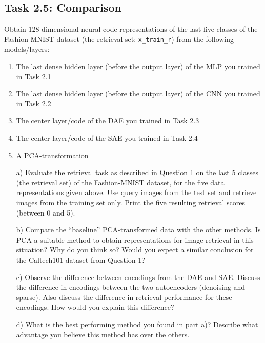 \documentclass[a4paper,twoside,10pt]{article}
\begin{document}
\subsection*{Task 2.5: Comparison}
Obtain 128-dimensional neural code representations of the last five classes of the Fashion-MNIST dataset (the retrieval set: \texttt{x\_train\_r}) from the following models/layers:
\begin{enumerate}
\item The last dense hidden layer (before the output layer) of the MLP you trained in Task 2.1
\item The last dense hidden layer (before the output layer) of the CNN you trained in Task 2.2
\item The center layer/code of the DAE you trained in Task 2.3
\item The center layer/code of the SAE you trained in Task 2.4
\item A PCA-transformation
\end{enumerate}

\begin{itemize}
  \item[a)] Evaluate the retrieval task as described in Question 1 on the last 5 classes (the retrieval set) of the Fashion-MNIST dataset, for the five data representations given above. Use query images from the test set and retrieve images from the training set only. Print the five resulting retrieval scores (between 0 and 5).
  \item[b)] Compare the ``baseline'' PCA-transformed data with the other methods. Is PCA a suitable method to obtain representations for image retrieval in this situation? Why do you think so? Would you expect a similar conclusion for the Caltech101 dataset from Question 1?
  \item[c)] Observe the difference between encodings from the DAE and SAE. Discuss the difference in encodings between the two autoencoders (denoising and sparse). Also discuss the difference in retrieval performance for these encodings. How would you explain this difference?
  \item[d)] What is the best performing method you found in part a)? Describe what advantage you believe this method has over the others.
\end{itemize}
\end{document}
